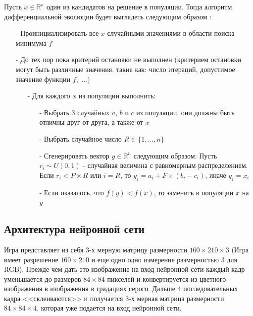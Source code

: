 \documentclass[12pt]{article}
\begin{document}
        Пусть $x \in \mathbb{R}^n$ один из кандидатов на решение в популяции. Тогда алгоритм дифференциальной эволюции будет выглядеть следующим образом \cite{params-for-de}:

        \begin{itemize}
            \item[-] Проинициализировать все $x$ случайными значениями в области поиска минимума $f$
            \item[-] До тех пор пока критерий остановки не выполнен (критерием остановки могут быть различные значения, такие как: число итераций, допустимое значение функции $f$,~...)
            \begin{itemize}
                \item[-] Для каждого $x$ из популяции выполнить:
                \begin{itemize}
                    \item[-] Выбрать 3 случайных $a$, $b$ и $c$ из популяции, они должны быть отличны друг от друга, а также от $x$
                    \item[-] Выбрать случайное число $R \in \{1, ..., n\}$
                    \item[-] Сгенерировать вектор $y \in \mathbb{R}^n$ следующим образом: Пусть $r_i \sim U(0, 1)$ - случайная величина с равномерным распределением. Если $r_i < P \times R$ или $i = R$, то $y_i = a_i + F \times (b_i - c_i)$, иначе $y_i = x_i$
                    \item[-] Если оказалось, что $f(y) < f(x)$, то заменить в популяции $x$ на $y$
                \end{itemize}
            \end{itemize}
        \end{itemize}

        \subsection{Архитектура нейронной сети}
            Игра представляет из себя $3$-х мерную матрицу размерности $160 \times 210 \times 3$ (Игра имеет разрешение $160 \times 210$ и еще одно одно измерение размерностью $3$ для RGB). Прежде чем дать это изображение на вход нейронной сети каждый кадр уменьшается до размеров $84 \times 84$ пикселей и конвертируется из цветного изображения в изображения в градациях серого. Дальше 4 последовательных кадра <<склеиваются>> и получается $3$-х мерная матрица размерности $84 \times 84 \times 4$, которая уже подается на вход нейронной сети. \\
\end{document}
